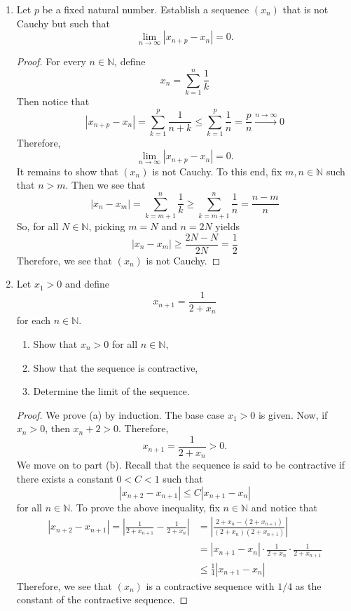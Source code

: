 \documentclass[12pt, reqno]{article}
\numberwithin{equation}{section}
\theoremstyle{definition}
\theoremstyle{remark}
\newcommand{\NN}{\mathbb{N}}
\newcommand{\abs}[1]{\left\lvert#1\right\rvert}
\begin{document}
\begin{enumerate}[leftmargin=*]
	\item Let $p$ be a fixed natural number. Establish a sequence $(x_n)$ that is not Cauchy but such that
	      \[
		      \lim_{n\to\infty}\abs{x_{n+p} - x_n} = 0.
	      \]
	      \begin{proof}
		      For every $n\in\NN$, define
		      \[
			      x_n = \sum_{k=1}^n \frac{1}{k}
		      \]
		      Then notice that
		      \[
			      \abs{x_{n+p} - x_n} = \sum_{k=1}^p \frac{1}{n + k} \leq \sum_{k=1}^p \frac{1}{n} = \frac{p}{n} \xrightarrow{n\to\infty} 0
		      \]
		      Therefore,
		      \[
			      \lim_{n\to\infty}\abs{x_{n+p} - x_n} = 0.
		      \]
		      It remains to show that $(x_n)$ is not Cauchy. To this end, fix $m, n \in \NN$ such that $n > m$. Then we see that
		      \[
			      \abs{x_n - x_m} = \sum_{k={m+1}}^n\frac{1}{k}
			      \geq \sum_{k={m+1}}^n\frac{1}{n}
			      = \frac{n-m}{n}
		      \]
		      So, for all $N\in \NN$, picking $m = N$ and $n = 2N$ yields
		      \[
			      \abs{x_n - x_m} \geq \frac{2N - N}{2N} = \frac{1}{2}
		      \]
		      Therefore, we see that $(x_n)$ is not Cauchy.
	      \end{proof}

	\item Let $x_1>0$ and define
	      \[
		      x_{n+1} = \frac{1}{2+x_n}
	      \]
	      for each $n\in\NN$.
	      \begin{enumerate}
		      \item Show that $x_n > 0$ for all $n\in\NN$,
		      \item Show that the sequence is contractive,
		      \item Determine the limit of the sequence.
	      \end{enumerate}

	      \begin{proof}
		      We prove (a) by induction. The base case $x_1>0$ is given. Now, if $x_n > 0$, then $x_n + 2 > 0$. Therefore,
		      \[
			      x_{n+1} = \frac{1}{2+x_n} > 0.
		      \]
		      We move on to part (b). Recall that the sequence is said to be contractive if there exists a constant $0<C<1$ such that
		      \[
			      \abs{x_{n+2} - x_{n+1}} \leq C\abs{x_{n+1} - x_n}
		      \]
		      for all $n\in \NN$. To prove the above inequality, fix $n\in \NN$ and notice that
		      \begin{align*}
			      \abs{x_{n+2} - x_{n+1}}
			      =\abs{\frac{1}{2+x_{n+1}} - \frac{1}{2+x_n}}
			       & =\abs{\frac{2+x_n - (2+x_{n+1})}{(2+x_n)(2+x_{n+1})}}              \\
			       & = \abs{x_{n+1} - x_n}\cdot \frac{1}{2+x_n}\cdot\frac{1}{2+x_{n+1}} \\
			       & \leq \frac{1}{4}\abs{x_{n+1} - x_n}
		      \end{align*}
		      Therefore, we see that $(x_n)$ is a contractive sequence with $1/4$ as the constant of the contractive sequence.


\end{proof}
\end{enumerate}
\end{document}
